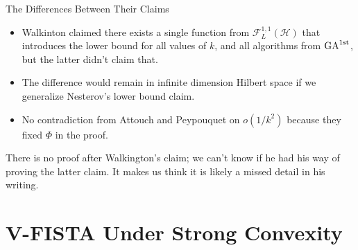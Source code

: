 \documentclass[11pt]{beamer}
\theoremstyle{definition}
\begin{document}
    \begin{frame}{The Differences Between Their Claims}
        \begin{itemize}
            \item Walkinton claimed there exists a single function from $\mathcal F_{L}^{1,1}(\mathcal H)$ that introduces the lower bound for all values of $k$, and all algorithms from $\text{GA}^{\text{1st}}$, but the latter didn't claim that. 
            \item The difference would remain in infinite dimension Hilbert space if we generalize Nesterov's lower bound claim. 
            \item No contradiction from Attouch and Peypouquet \cite{attouch_rate_2016} on $o(1/k^2)$ because they fixed $\Phi$ in the proof. 
        \end{itemize}
        There is no proof after Walkington's claim; we can't know if he had his way of proving the latter claim. 
        It makes us think it is likely a missed detail in his writing. 
    \end{frame}

 

\section{V-FISTA Under Strong Convexity}
\end{document}
